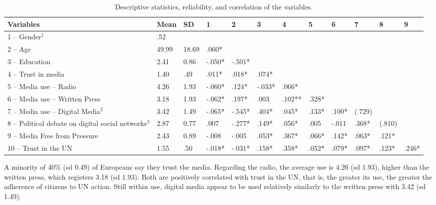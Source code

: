 \documentclass[english]{textolivre}
\begin{document}
\begin{table}[h!]
\centering
\begin{threeparttable}
\caption{Descriptive statistics, reliability, and correlation of the variables.}\label{tab-2}
\scriptsize
\begin{tabular}{p{2.6cm} p{0.5cm} p{0.5cm} p{0.7cm} p{0.7cm} p{0.7cm} p{0.7cm} p{0.7cm} p{0.7cm} p{0.7cm} p{0.7cm} p{0.5cm}}
\toprule
Variables & Mean & SD & 1 & 2 & 3 & 4 & 5 & 6 & 7 & 8 & 9 \\
\midrule
1 – Gender$^1$ & .52 &  &  &  &  &  &  &  &  &  &  \\
2 – Age & 49.99 & 18.69 & .060* &  &  &  &  &  &  &  &  \\
3 – Education & 2.41 & 0.86 & -.050* & -.501* &  &  &  &  &  &  &  \\
4 – Trust in media & 1.40 & .49 & .011* & .018* & .074* &  &  &  &  &  &  \\
5 – Media use – Radio & 4.26 & 1.93 & -.060* & .124* & -.033* & .066* &  &  &  &  &  \\
6 – Media use – Written Press & 3.18 & 1.93 & -.062* & .197* & .003 & .102** & .328* &  &  &  &  \\
7 – Media use – Digital Media$^2$ & 3.42 & 1.49 & -.065* & -.545* & .404* & .045* & .133* & .100* & (.729) &  &  \\
8 – Political debate on digital social networks$^3$ & 2.87 & 0.77 & .007 & -.277* & .149* & .056* & .005 & -.011 & .368* & (.810) &  \\
9 – Media Free from Pressure & 2.43 & 0.89 & -.008 & -.005 & .053* & .367* & .066* & .142* & .063* & .121* &  \\
10 – Trust in the UN & 1.55 & .50 & -.018* & -.031* & .158* & .358* & .052* & .079* & .097* & .123* & .246* \\
\bottomrule
\end{tabular}
\end{threeparttable}
\end{table}

A minority of 40\% (sd 0.49) of Europeans say they trust the media. Regarding the radio, the average use is 4.26 (sd 1.93), higher than the written press, which registers 3.18 (sd 1.93). Both are positively correlated with trust in the UN, that is, the greater its use, the greater the adherence of citizens to UN action. Still within use, digital media appear to be used relatively similarly to the written press with 3.42 (sd 1.49).
\end{document}
